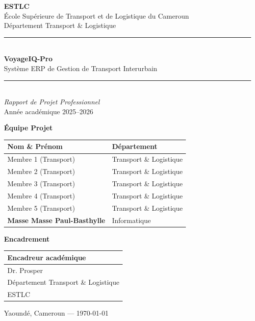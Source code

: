 \documentclass[12pt,a4paper]{report}
\begin{document}
\begin{titlepage}
    \centering
    \vspace*{1.5cm}

    {\Large\textbf{ESTLC}}\\[0.3cm]
    {\large École Supérieure de Transport et de Logistique du Cameroun}\\[0.2cm]
    {\normalsize Département Transport \& Logistique}\\[1cm]

    \rule{\linewidth}{1.5pt}\\[0.4cm]
    {\Huge\bfseries\color{gold} VoyageIQ-Pro}\\[0.3cm]
    {\Large Système ERP de Gestion de Transport Interurbain}\\[0.2cm]
    \rule{\linewidth}{1.5pt}\\[1cm]

    {\large\textit{Rapport de Projet Professionnel}}\\[0.2cm]
    {\normalsize Année académique 2025--2026}\\[1.5cm]

    \begin{minipage}{0.48\textwidth}
        \centering
        \textbf{Équipe Projet}\\[0.3cm]
        \begin{tabular}{ll}
            \toprule
            \textbf{Nom \& Prénom} & \textbf{Département} \\
            \midrule
            Membre 1 (Transport)   & Transport \& Logistique \\
            Membre 2 (Transport)   & Transport \& Logistique \\
            Membre 3 (Transport)   & Transport \& Logistique \\
            Membre 4 (Transport)   & Transport \& Logistique \\
            Membre 5 (Transport)   & Transport \& Logistique \\
            \textbf{Masse Masse Paul-Basthylle} & Informatique \\
            \bottomrule
        \end{tabular}
    \end{minipage}
    \hfill
    \begin{minipage}{0.45\textwidth}
        \centering
        \textbf{Encadrement}\\[0.3cm]
        \begin{tabular}{l}
            \toprule
            \textbf{Encadreur académique} \\
            \midrule
            Dr. Prosper \\
            Département Transport \& Logistique\\
            ESTLC \\
            \bottomrule
        \end{tabular}
    \end{minipage}

    \vfill
    {\normalsize Yaoundé, Cameroun --- \today}
\end{titlepage}
\end{document}
